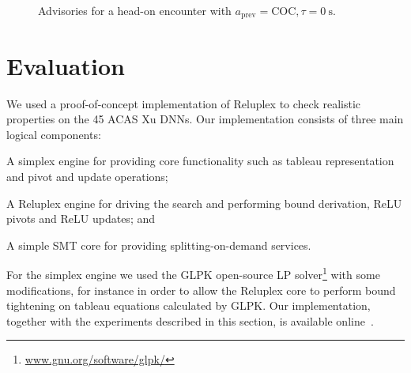 \documentclass[a4paper]{llncs}
\begin{document}
\begin{figure}[htp]
	\centering
	\caption{Advisories for a head-on encounter with $a_\text{prev} = \text{COC},\tau=\SI{0}{\second}$.}
	\label{fig_headon}
\end{figure}


\section{Evaluation}
\label{sec:evaluation}
We used a proof-of-concept implementation of Reluplex 
to check realistic properties on the 45 ACAS Xu DNNs.
Our implementation consists of three main logical components:
\begin{inparaenum}[(i)]
\item A simplex engine
  for providing core
  functionality such as tableau representation and pivot and update
  operations;
\item
  A Reluplex engine for driving the search and performing bound derivation, ReLU pivots and
  ReLU updates; and
\item 
  A simple SMT core for providing splitting-on-demand services.
\end{inparaenum}
For the simplex engine we used the GLPK open-source LP
solver\footnote{\url{www.gnu.org/software/glpk/}} with some modifications, 
for instance in order to allow the Reluplex core to perform
bound tightening on tableau equations
calculated by GLPK. Our implementation, together with the experiments
described in this section, is available online~\cite{reluplexCode}.
\end{document}
